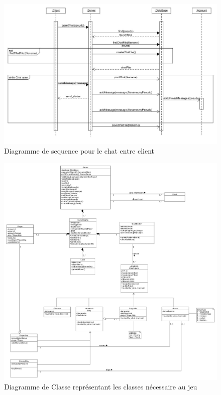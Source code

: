 \documentclass[a4paper,12pt]{article}
\begin{document}
\begin{figure}[hbtp]
\centering
\includegraphics[scale=0.4]{Chat-sequence-diagram}
\caption{Diagramme de sequence pour le chat entre client }
\end{figure}


\begin{figure}[hbtp]
\centering
\includegraphics[scale=0.3]{newGameClassDiagram.jpg}
\caption{Diagramme de Classe représentant les classes nécessaire au jeu}
\end{figure}
\end{document}

